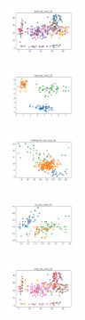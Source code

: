 \begin{figure}[H]
\begin{subfigure}
    \end{subfigure}
    \hfill
    \begin{subfigure}
        \centering
        \includegraphics[width=0.234\textwidth]{img/copkm/ecoli_set_const_20_589741062_clust.png}
    \end{subfigure}
    \hfill
    \begin{subfigure}
        \centering
        \includegraphics[width=0.234\textwidth]{img/copkm/rand_set_const_20_589741062_clust.png}
    \end{subfigure}
    \hfill
    \begin{subfigure}
        \centering
        \includegraphics[width=0.234\textwidth]{img/copkm/newthyroid_set_const_20_589741062_clust.png}
    \end{subfigure}
    \hfill
    \begin{subfigure}
        \centering
        \includegraphics[width=0.234\textwidth]{img/copkm/iris_set_const_20_277451237_clust.png}
    \end{subfigure}
    \hfill
    \begin{subfigure}
        \centering
        \includegraphics[width=0.234\textwidth]{img/copkm/ecoli_set_const_20_277451237_clust.png}
    \end{subfigure}
    \hfill

\end{figure}
